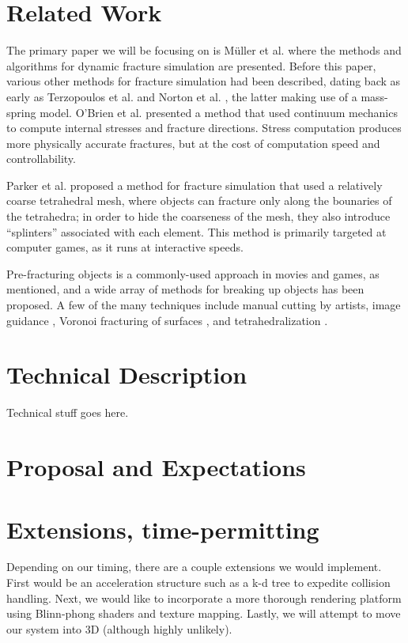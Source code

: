 \documentclass[tog]{acmsiggraph}
\begin{document}
\section{Related Work}

The primary paper we will be focusing on is M\"uller et
al. \cite{Mul13} where the methods and algorithms for dynamic fracture
simulation are presented. Before this paper, various other methods for
fracture simulation had been described, dating back as early as
Terzopoulos et al. \cite{Ter88} and Norton et al. \cite{Nor91}, the
latter making use of a mass-spring model. O'Brien et al. \cite{Obr99}
presented a method that used continuum mechanics to compute internal
stresses and fracture directions. Stress computation produces more
physically accurate fractures, but at the cost of computation speed
and controllability.

Parker et al. \cite{Par09} proposed a method for fracture simulation
that used a relatively coarse tetrahedral mesh, where objects can
fracture only along the bounaries of the tetrahedra; in order to hide
the coarseness of the mesh, they also introduce ``splinters''
associated with each element. This method is primarily targeted at
computer games, as it runs at interactive speeds.

Pre-fracturing objects is a commonly-used approach in movies and
games, as mentioned, and a wide array of methods for breaking up
objects has been proposed. A few of the many techniques include manual
cutting by artists, image guidance \cite{Mou05}, Voronoi fracturing of
surfaces \cite{Rag02}, and tetrahedralization \cite{Par09}.

\section{Technical Description}

Technical stuff goes here.

\section{Proposal and Expectations}



\section{Extensions, time-permitting}

Depending on our timing, there are a couple extensions we would implement. First
would be an acceleration structure such as a k-d tree to expedite collision handling.
Next, we would like to incorporate a more thorough rendering platform using Blinn-phong
shaders and texture mapping. Lastly, we will attempt to move our system into 3D (although
highly unlikely).




\end{document}
